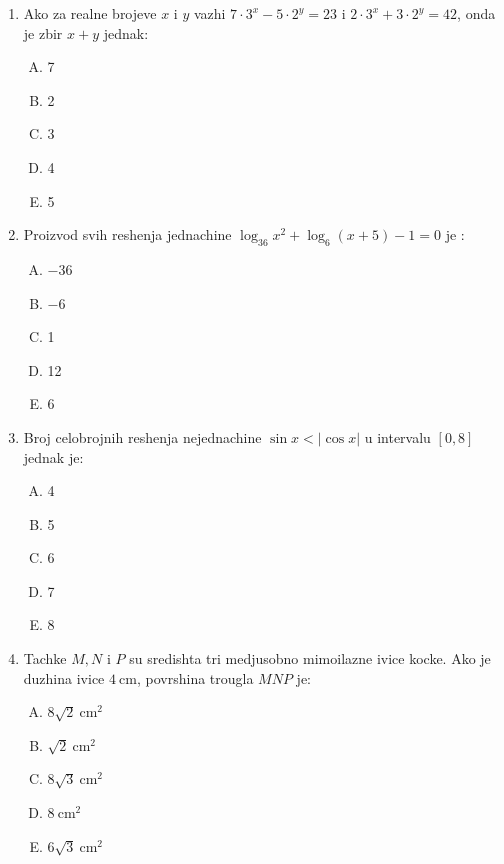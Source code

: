 \documentclass[a4paper,12pt]{article}
\newcommand{\Lat}{\fontencoding{OT1}\selectfont}
\begin{document}
\begin{enumerate}[1.]
\item Ako za realne brojeve $x$  i $y$ vazhi $7 \cdot 3^{x} - 5 \cdot 2^{y} = 23$ i $2 \cdot 3^{x} + 3 \cdot 2^{y} = 42$, onda je zbir $x + y$ jednak:
{\Lat
\begin{multicols}{5}
\begin{enumerate}[A)]
\item 7 \item 2 \item 3 \item 4 \item 5
\end{enumerate}
\end{multicols}
}


\item Proizvod svih reshenja jednachine $ \log_{36} x^{2} + \log_6 (x + 5) -1 = 0$ je :
{\Lat
\begin{multicols}{5}
\begin{enumerate}[A)]
\item $-36$ \item $-6$ \item 1 \item 12 \item 6
\end{enumerate}
\end{multicols}
}


\item Broj celobrojnih reshenja nejednachine $\sin{x} < \lvert \cos{x} \rvert $ u intervalu $[ 0,8] $ jednak je: 
{\Lat
\begin{multicols}{5}
\begin{enumerate}[A)]
\item 4 \item 5 \item 6 \item 7 \item 8
\end{enumerate}
\end{multicols}
}

\item Tachke $M,N$ i $P$ su sredishta tri medjusobno mimoilazne ivice kocke. Ako je duzhina ivice $4\mathrm{\ cm}$, povrshina trougla $MNP$ je:
{\Lat
\begin{multicols}{5}
\begin{enumerate}[A)]
\item $8\sqrt{2}\mathrm{\ cm}^2$ \item $\sqrt{2}\mathrm{\ cm}^2$ \item $8\sqrt{3}\mathrm{\ cm}^2$ \item $8\mathrm{\ cm}^2$ \item $6\sqrt{3}\mathrm{\ cm}^2$
\end{enumerate}
\end{multicols}
}


\end{enumerate}
\end{document}

